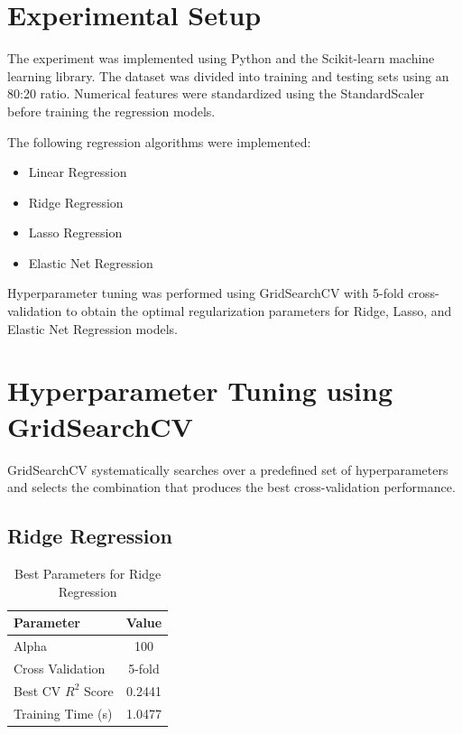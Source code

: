 \documentclass{article}
\begin{document}
\section{Experimental Setup}

The experiment was implemented using Python and the Scikit-learn machine learning library. The dataset was divided into training and testing sets using an 80:20 ratio. Numerical features were standardized using the StandardScaler before training the regression models.

The following regression algorithms were implemented:

\begin{itemize}
    \item Linear Regression
    \item Ridge Regression
    \item Lasso Regression
    \item Elastic Net Regression
\end{itemize}

Hyperparameter tuning was performed using GridSearchCV with 5-fold cross-validation to obtain the optimal regularization parameters for Ridge, Lasso, and Elastic Net Regression models.

\section{Hyperparameter Tuning using GridSearchCV}

GridSearchCV systematically searches over a predefined set of hyperparameters and selects the combination that produces the best cross-validation performance.

\subsection{Ridge Regression}

\begin{table}[H]
\centering
\caption{Best Parameters for Ridge Regression}
\begin{tabular}{|l|c|}
\hline
Parameter & Value\\
\hline
Alpha & 100\\
Cross Validation & 5-fold\\
Best CV $R^2$ Score & 0.2441\\
Training Time (s) & 1.0477\\
\hline
\end{tabular}
\end{table}
\end{document}
